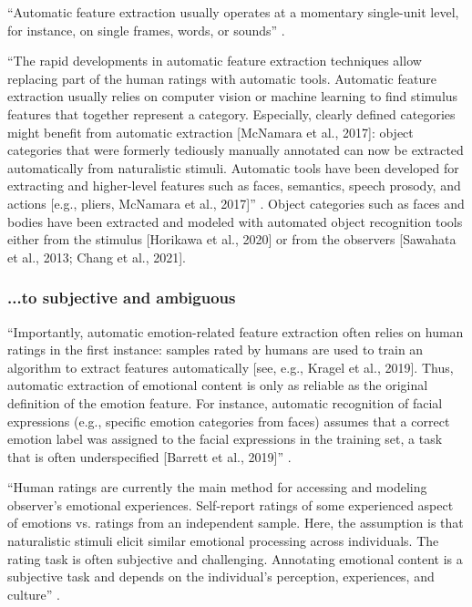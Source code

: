 %
``Automatic feature extraction usually operates at a momentary single-unit
level, for instance, on single frames, words, or sounds''
\citep{saarimaki2021naturalistic}.


``The rapid developments in automatic feature extraction techniques allow
replacing part of the human ratings with automatic tools.
%
Automatic feature extraction usually relies on computer vision or machine
learning to find stimulus features that together represent a category.
%
Especially, clearly defined categories might benefit from automatic extraction
[McNamara et al., 2017]:
%
object categories that were formerly tediously manually annotated can now be
extracted automatically from naturalistic stimuli.
%
Automatic tools have been developed for extracting and higher-level features
such as faces, semantics, speech prosody, and actions [e.g., pliers, McNamara et
al., 2017]'' \citep{saarimaki2021naturalistic}.
%
Object categories such as faces and bodies have been extracted and modeled with
automated object recognition tools either from the stimulus [Horikawa et al.,
2020] or from the observers [Sawahata et al., 2013; Chang et al., 2021].


\subsubsection{...to subjective and ambiguous}

%
``Importantly, automatic emotion-related feature extraction often relies on
human ratings in the first instance:
%
samples rated by humans are used to train an algorithm to extract features
automatically [see, e.g., Kragel et al., 2019].
%
Thus, automatic extraction of emotional content is only as reliable as the
original definition of the emotion feature.
%
For instance, automatic recognition of facial expressions (e.g., specific
emotion categories from faces) assumes that a correct emotion label was assigned
to the facial expressions in the training set, a task that is often
underspecified [Barrett et al., 2019]'' \citep{saarimaki2021naturalistic}.

%
``Human ratings are currently the main method for accessing and modeling
observer’s emotional experiences.
%
Self-report ratings of some experienced aspect of emotions vs. ratings from an
independent sample.
%
Here, the assumption is that naturalistic stimuli elicit similar emotional
processing across individuals.
%
The rating task is often subjective and challenging.
%
Annotating emotional content is a subjective task and depends on the
individual’s perception, experiences, and culture''
\citep{saarimaki2021naturalistic}.


